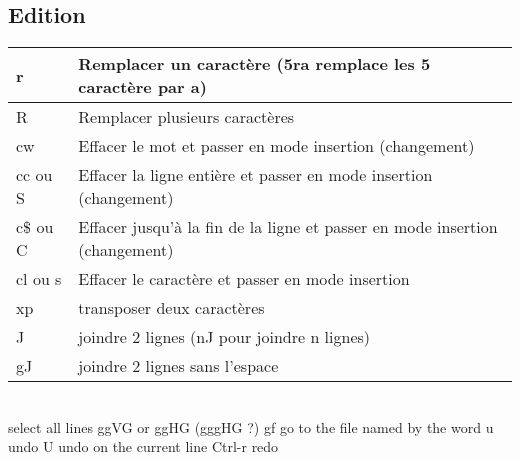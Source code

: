 \documentclass{article}
\begin{document}
\subsection{Edition}
\begin{tabular}{|p{3cm}| l| }
\hline
r & Remplacer un caractère (5ra remplace les 5 caractère par a)\\ \hline
R & Remplacer plusieurs caractères\\ \hline
cw & Effacer le mot et passer en mode insertion (changement)\\ \hline
cc ou S & Effacer la ligne entière et passer en mode insertion (changement)\\ \hline
c\$ ou C & Effacer jusqu'à la fin de la ligne et passer en mode insertion (changement)\\ \hline
cl ou s & Effacer le caractère et passer en mode insertion \\ \hline
xp & transposer deux caractères\\ \hline
J & joindre 2 lignes (nJ pour joindre n lignes)\\ \hline
gJ &joindre 2 lignes sans l'espace\\ \hline
\end{tabular}\\

select all lines ggVG or ggHG (gggHG ?)
gf go to the file named by the word
u undo
U undo on the current line
Ctrl-r redo
    
\end{document}
